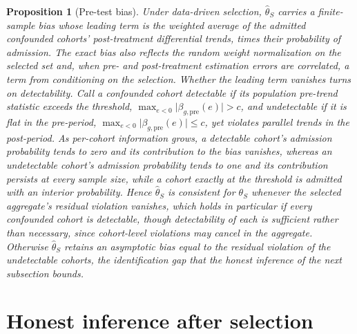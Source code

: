 \documentclass[12pt]{article}
\newtheorem{proposition}{Proposition}
\theoremstyle{remark}
\begin{document}
\begin{proposition}[Pre-test bias]\label{prop:pretest}
Under data-driven selection, $\hat\theta_S$ carries a finite-sample bias whose leading term is the weighted
average of the admitted confounded cohorts' post-treatment differential trends, times their probability of
admission. The exact bias also reflects the random weight normalization on the selected set and, when pre-
and post-treatment estimation errors are correlated, a term from conditioning on the selection. Whether the
leading term vanishes turns on detectability. Call a confounded cohort detectable if its
population pre-trend statistic exceeds the threshold, $\max_{e<0}\lvert\beta_{g,\mathrm{pre}}(e)\rvert>c$,
and undetectable if it is flat in the pre-period, $\max_{e<0}\lvert\beta_{g,\mathrm{pre}}(e)\rvert\le c$,
yet violates parallel trends in the post-period. As per-cohort information grows, a detectable cohort's
admission probability tends to zero and its contribution to the bias vanishes, whereas an undetectable
cohort's admission probability tends to one and its contribution persists at every sample size, while a
cohort exactly at the threshold is admitted with an interior probability. Hence
$\hat\theta_S$ is consistent for $\theta_S$ whenever the selected aggregate's residual violation vanishes,
which holds in particular if every confounded cohort is detectable, though detectability of each is
sufficient rather than necessary, since cohort-level violations may cancel in the aggregate. Otherwise
$\hat\theta_S$ retains an asymptotic bias equal to the residual violation of the undetectable cohorts, the
identification gap that the honest inference of the next subsection bounds.
\end{proposition}

\section{Honest inference after selection}\label{sec:honest}
\end{document}
